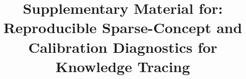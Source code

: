 \documentclass[sn-mathphys]{sn-jnl}
\begin{document}
\title[Supplementary Material]{Supplementary Material for: Reproducible Sparse-Concept and Calibration Diagnostics for Knowledge Tracing}
\maketitle

\begin{appendices}

\end{appendices}
\end{document}

